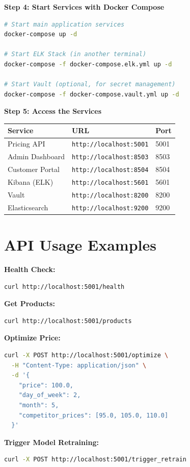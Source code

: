 \documentclass[12pt,a4paper]{report}
\begin{document}
\textbf{Step 4: Start Services with Docker Compose}
\begin{lstlisting}[language=bash]
# Start main application services
docker-compose up -d

# Start ELK Stack (in another terminal)
docker-compose -f docker-compose.elk.yml up -d

# Start Vault (optional, for secret management)
docker-compose -f docker-compose.vault.yml up -d
\end{lstlisting}

\textbf{Step 5: Access the Services}

\begin{tabular}{|l|l|l|}
\hline
\textbf{Service} & \textbf{URL} & \textbf{Port} \\
\hline
Pricing API & \texttt{http://localhost:5001} & 5001 \\
Admin Dashboard & \texttt{http://localhost:8503} & 8503 \\
Customer Portal & \texttt{http://localhost:8504} & 8504 \\
Kibana (ELK) & \texttt{http://localhost:5601} & 5601 \\
Vault & \texttt{http://localhost:8200} & 8200 \\
Elasticsearch & \texttt{http://localhost:9200} & 9200 \\
\hline
\end{tabular}

\section{API Usage Examples}

\textbf{Health Check:}
\begin{lstlisting}[language=bash]
curl http://localhost:5001/health
\end{lstlisting}

\textbf{Get Products:}
\begin{lstlisting}[language=bash]
curl http://localhost:5001/products
\end{lstlisting}

\textbf{Optimize Price:}
\begin{lstlisting}[language=bash]
curl -X POST http://localhost:5001/optimize \
  -H "Content-Type: application/json" \
  -d '{
    "price": 100.0,
    "day_of_week": 2,
    "month": 5,
    "competitor_prices": [95.0, 105.0, 110.0]
  }'
\end{lstlisting}

\textbf{Trigger Model Retraining:}
\begin{lstlisting}[language=bash]
curl -X POST http://localhost:5001/trigger_retrain
\end{lstlisting}
\end{document}
